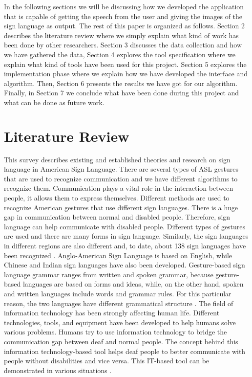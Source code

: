 \documentclass[twocolumn,10pt]{asme2ej}
\begin{document}
In the following sections we will be discussing how we developed the application that is capable of getting the speech from the user and giving the images of the sign language as output. The rest of this paper is organized as follows. Section 2 describes the literature review where we simply explain what kind of work has been done by other researchers. Section 3 discusses the data collection and how we have gathered the data, Section 4 explores the tool specification where we explain what kind of tools have been used for this project. Section 5 explores the implementation phase where we explain how we have developed the interface and algorithm. Then, Section 6 presents the results we have got for our algorithm. Finally, in Section 7 we conclude what have been done during this project and what can be done as future work.


\section{Literature Review}

This survey describes existing and established theories and research on sign language in American Sign Language. There are several types of ASL gestures that are used to recognize communication and we have different algorithms to recognize them. Communication plays a vital role in the interaction between people, it allows them to express themselves. Different methods are used to recognize American gestures that use different sign languages.
There is a huge gap in communication between normal and disabled people. Therefore, sign language can help communicate with disabled people. Different types of gestures are used and there are many forms in sign language. Similarly, the sign languages in different regions are also different and, to date, about 138 sign languages have been recognized \cite{1241384}. Anglo-American Sign Language is based on English, while Chinese and Indian sign languages have also been developed. Gesture-based sign language grammar ranges from written and spoken grammar, because gesture-based languages are based on forms and ideas, while, on the other hand, spoken and written languages include words and grammar rules. For this particular reason, the two languages have different grammatical structure \cite{servingdeaf}. The field of information technology has been strongly affecting human life. Different technologies, tools, and equipment have been developed to help humans solve various problems. Humans try to use information technology to bridge the communication gap between deaf and normal people. The concept behind this information technology-based tool helps deaf people to better communicate with people without disabilities and vice versa. This IT-based tool can be demonstrated in various situations \cite{american-interperete}. 
\end{document}
